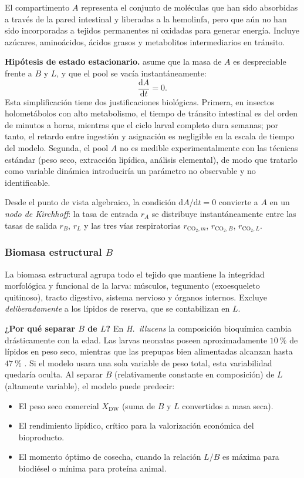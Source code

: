 El compartimento $A$ representa el conjunto de moléculas que han sido absorbidas a través de la pared intestinal y liberadas a la hemolinfa, pero que aún no han sido incorporadas a tejidos permanentes ni oxidadas para generar energía. Incluye azúcares, aminoácidos, ácidos grasos y metabolitos intermediarios en tránsito.

\textbf{Hipótesis de estado estacionario.} \textcite{eriksenDynamicModellingFeed2022} asume que la masa de $A$ es despreciable frente a $B$ y $L$, y que el pool se vacía instantáneamente:
\begin{equation}
    \frac{\mathrm{d}A}{\mathrm{d}t} = 0.
    \label{eq:dA_dt}
\end{equation}
Esta simplificación tiene dos justificaciones biológicas. Primera, en insectos holometábolos con alto metabolismo, el tiempo de tránsito intestinal es del orden de minutos a horas, mientras que el ciclo larval completo dura semanas; por tanto, el retardo entre ingestión y asignación es negligible en la escala de tiempo del modelo. Segunda, el pool $A$ no es medible experimentalmente con las técnicas estándar (peso seco, extracción lipídica, análisis elemental), de modo que tratarlo como variable dinámica introduciría un parámetro no observable y no identificable.

Desde el punto de vista algebraico, la condición $\mathrm{d}A/\mathrm{d}t=0$ convierte a $A$ en un \emph{nodo de Kirchhoff}: la tasa de entrada $r_A$ se distribuye instantáneamente entre las tasas de salida $r_B$, $r_L$ y las tres vías respiratorias $r_{\mathrm{CO_2},m}$, $r_{\mathrm{CO_2},B}$, $r_{\mathrm{CO_2},L}$.

\subsubsection{Biomasa estructural $B$}

La biomasa estructural agrupa todo el tejido que mantiene la integridad morfológica y funcional de la larva: músculos, tegumento (exoesqueleto quitinoso), tracto digestivo, sistema nervioso y órganos internos. Excluye \emph{deliberadamente} a los lípidos de reserva, que se contabilizan en $L$.

\textbf{¿Por qué separar $B$ de $L$?} En \textit{H.~illucens} la composición bioquímica cambia drásticamente con la edad. Las larvas neonatas poseen aproximadamente $\SI{10}{\percent}$ de lípidos en peso seco, mientras que las prepupas bien alimentadas alcanzan hasta $\SI{47}{\percent}$ \parencite{eriksenDynamicModellingFeed2022}. Si el modelo usara una sola variable de peso total, esta variabilidad quedaría oculta. Al separar $B$ (relativamente constante en composición) de $L$ (altamente variable), el modelo puede predecir:
\begin{itemize}
    \item El peso seco comercial $X_{\mathrm{DW}}$ (suma de $B$ y $L$ convertidos a masa seca).
    \item El rendimiento lipídico, crítico para la valorización económica del bioproducto.
    \item El momento óptimo de cosecha, cuando la relación $L/B$ es máxima para biodiésel o mínima para proteína animal.
\end{itemize}

